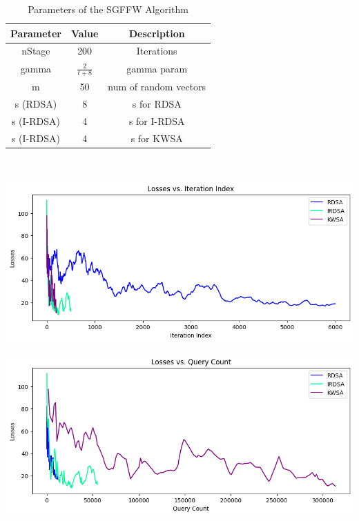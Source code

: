 \documentclass[10pt,twocolumn,letterpaper]{article}
\begin{document}
\begin{table}[h]
   \centering
   \begin{tabular}{ccc}
       \hline
       Parameter & Value & Description \\
       \hline
       nStage & 200 & Iterations\\
       \hline
       gamma & $\frac{2}{t+8}$ & gamma param \\
       \hline
       m & 50 & num of random vectors\\
       \hline
       s (RDSA) & 8 & s for RDSA\\
       s (I-RDSA) & 4 & s for I-RDSA\\
       s (I-RDSA) & 4 & s for KWSA\\
       \hline
   \end{tabular}
   \
   \caption{Parameters of the SGFFW Algorithm} 
   \label{tab:sgffw_params}
\end{table}


\begin{center}
   \includegraphics*[scale=0.35]{img/SGFFW_loss_vs_iterations.png}
\end{center}

\begin{center}
   \includegraphics*[scale=0.35]{img/SGFFW_loss_vs_querycount.png}
\end{center}
\end{document}
